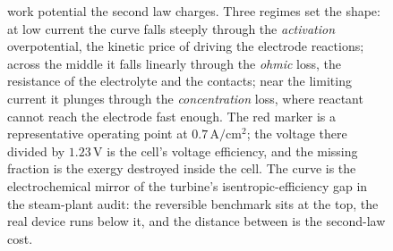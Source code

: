 \begin{figure}[htbp]
{work potential the second law charges. Three regimes set the shape: at low current
the curve falls steeply through the \emph{activation} overpotential, the kinetic
price of driving the electrode reactions; across the middle it falls linearly
through the \emph{ohmic} loss, the resistance of the electrolyte and the contacts;
near the limiting current it plunges through the \emph{concentration} loss, where
reactant cannot reach the electrode fast enough. The red marker is a representative
operating point at $0.7\,\text{A}/\text{cm}^2$; the voltage there divided by
$1.23\,\text{V}$ is the cell's voltage efficiency, and the missing fraction is the
exergy destroyed inside the cell. The curve is the electrochemical mirror of the
turbine's isentropic-efficiency gap in the steam-plant audit: the reversible
benchmark sits at the top, the real device runs below it, and the distance between
is the second-law cost.}
\label{fig:vol04ch04:fuelcell-polarization}
\end{figure}
